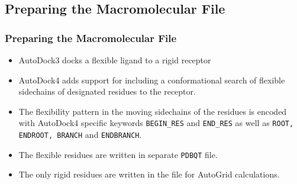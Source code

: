 \documentclass[slidestop,mathserif,compress,xcolor=svgnames]{beamer}
\begin{document}
\subsection{Preparing the Macromolecular File}
\begin{frame}[allowframebreaks]
  \frametitle{\small Preparing the Macromolecular File}
  \begin{block}{}
    \begin{itemize}
      \item AutoDock3 docks a flexible ligand to a rigid receptor
      \item AutoDock4 adds support for including a conformational search of flexible sidechains of designated residues to the receptor.
      \item The flexibility pattern in the moving sidechains of the residues is encoded with AutoDock4 specific keywords \texttt{BEGIN\_RES} and \texttt{END\_RES} as well as \texttt{ROOT, ENDROOT, BRANCH} and \texttt{ENDBRANCH}.
      \item The flexible residues are written in separate \texttt{PDBQT} file.
      \item The only rigid residues are written in the file for AutoGrid calculations.
    \end{itemize}
  \end{block}


\end{frame}
\end{document}
